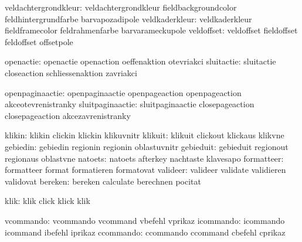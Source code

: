 veldachtergrondkleur:  veldachtergrondkleur fieldbackgroundcolor feldhintergrundfarbe
                       barvapozadipole
      veldkaderkleur:  veldkaderkleur       fieldframecolor      feldrahmenfarbe
                       barvarameckupole
          veldoffset:  veldoffset           fieldoffset          feldoffset
                       offsetpole

           openactie:  openactie            openaction           oeffenaktion
                       otevriakci
          sluitactie:  sluitactie           closeaction          schliessenaktion
                       zavriakci

     openpaginaactie:  openpaginaactie      openpageaction       openpageaction       
                       akceotevrenistranky  %
    sluitpaginaactie:  sluitpaginaactie     closepageaction      closepageaction      
                       akcezavrenistranky %
 
              klikin:  klikin               clickin              klickin
                       klikuvnitr
             klikuit:  klikuit              clickout             klickaus
                       klikvne
            gebiedin:  gebiedin             regionin             regionin
                       oblastuvnitr
           gebieduit:  gebieduit            regionout            regionaus
                       oblastvne
             natoets:  natoets              afterkey             nachtaste
                       klavesapo
          formatteer:  formatteer           format               formatieren
                       formatovat
            valideer:  valideer             validate             validieren
                       validovat
             bereken:  bereken              calculate            berechnen
                       pocitat

                klik:  klik                 click                klick  
                       klik 

           vcommando:  vcommando            vcommand             vbefehl
                       vprikaz
           icommando:  icommando            icommand             ibefehl
                       iprikaz
           ccommando:  ccommando            ccommand             cbefehl
                       cprikaz

\stopconstants



